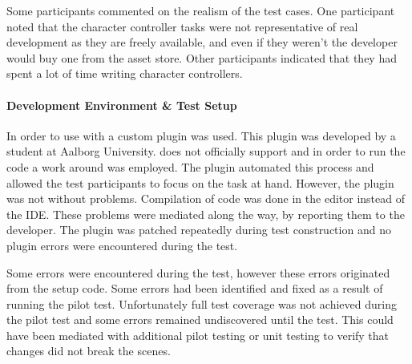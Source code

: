 Some participants commented on the realism of the test cases. One participant noted that the character controller tasks were not representative of real development as they are freely available, and even if they weren't the developer would buy one from the asset store. Other participants indicated that they had spent a lot of time writing character controllers.

\paragraph{Development Environment \& Test Setup}
In order to use \fs with \unity a custom plugin was used. This plugin was developed by a student at Aalborg University\cite{fsharp2019plugin}. \unity does not officially support \fs and in order to run the \fs code a work around was employed. The plugin automated this process and allowed the test participants to focus on the task at hand. However, the plugin was not without problems. Compilation of \fs code was done in the \unity editor instead of the \gls{IDE}. These problems were mediated along the way, by reporting them to the developer. The plugin was patched repeatedly during test construction and no plugin errors were encountered during the test.

Some errors were encountered during the test, however these errors originated from the setup code. Some errors had been identified and fixed as a result of running the pilot test. Unfortunately full test coverage was not achieved during the pilot test and some errors remained undiscovered until the test. This could have been mediated with additional pilot testing or unit testing to verify that changes did not break the scenes.
